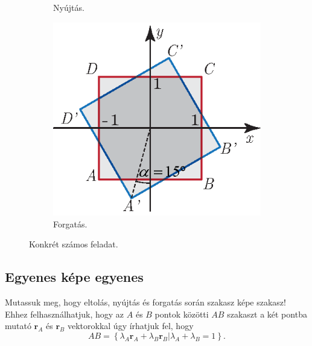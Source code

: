\documentclass[12pt,a4paper]{scrartcl}
\let\mathbf\bm
\begin{document}
\begin{figure}[htb]
\begin{subfigure}[b]{0.45\textwidth}
\caption{Nyújtás.}
\label{fig:nyujtas_feladat}
\end{subfigure}
\begin{subfigure}[b]{0.45\textwidth}
\centering
\includegraphics[scale=1]{figs/forgatas_feladat.eps}
\caption{Forgatás.}
\label{fig:forgatas_feladat}
\end{subfigure}
\label{fig:konret_szamos_feladat}
\caption{Konkrét számos feladat.}
\end{figure}
\FloatBarrier

\subsection{Egyenes képe egyenes}
Mutassuk meg, hogy eltolás, nyújtás és forgatás során szakasz képe szakasz! Ehhez felhasználhatjuk, hogy az $A$ és $B$ pontok közötti $AB$ szakaszt a két pontba mutató ${{\mathbf{r}}_A}$ és ${{\mathbf{r}}_B}$ vektorokkal úgy írhatjuk fel, hogy 
\[AB = \left\{ {\left. {{\lambda _A}{{\mathbf{r}}_A} + {\lambda _B}{{\mathbf{r}}_B}} \right|{\lambda _A} + {\lambda _B} = 1} \right\}.\]
\end{document}
